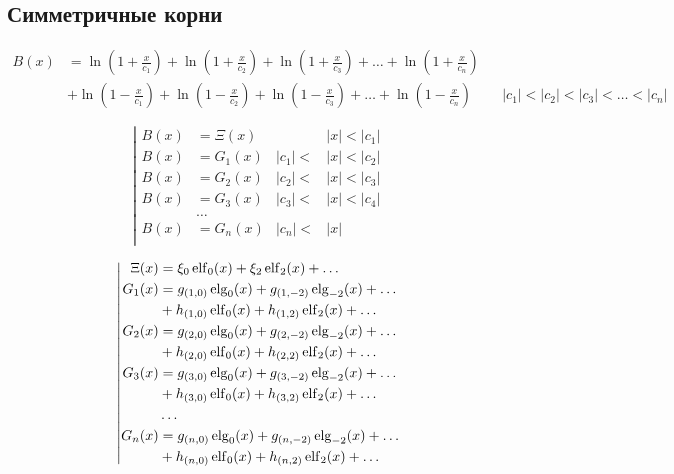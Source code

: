 
\subsection{Симметричные корни}

\begin{equation*} \begin{aligned}
B(x) &=
  \ln{\left(1 + \frac{x}{c_1} \right)}
+ \ln{\left(1 + \frac{x}{c_2} \right)}
+ \ln{\left(1 + \frac{x}{c_3} \right)}
+ \ldots
+ \ln{\left(1 + \frac{x}{c_n} \right)} \\ &
+ \ln{\left(1 - \frac{x}{c_1} \right)}
+ \ln{\left(1 - \frac{x}{c_2} \right)}
+ \ln{\left(1 - \frac{x}{c_3} \right)}
+ \ldots
+ \ln{\left(1 - \frac{x}{c_n} \right)} &
&|c_1| < |c_2| < |c_3| < \ldots < |c_n|
\end{aligned} \end{equation*}

\begin{equation*} \left| \begin{aligned}
B(x) &= \Xi(x) & 
&|x| < |c_1| \\
%
B(x) &= G_1(x) & 
|c_1| < &|x| < |c_2| \\
%
B(x) &= G_2(x) & 
|c_2| < &|x| < |c_3| \\
%
B(x) &= G_3(x) &
|c_3| < &|x| < |c_4| \\
&\ldots & & \\
%
B(x) &= G_n(x) &
|c_n| < &|x| \\
\end{aligned} \right. \end{equation*}

\begin{equation*} \left| \begin{aligned}
\Xi(x) &=
  \xi_0 \elf_0(x)
+ \xi_2 \elf_2(x) 
+ \ldots \\
%
G_1(x) &=
  g_{(1,0)} \elg_0(x) 
+ g_{(1,-2)} \elg_{-2}(x)
+ \ldots \\ &
+ h_{(1,0)} \elf_0(x)
+ h_{(1,2)} \elf_2(x)
+ \ldots \\
%
G_2(x) &=
  g_{(2,0)} \elg_0(x) 
+ g_{(2,-2)} \elg_{-2}(x)
+ \ldots \\ &
+ h_{(2,0)} \elf_0(x)
+ h_{(2,2)} \elf_2(x)
+ \ldots \\
%
G_3(x) &=
  g_{(3,0)} \elg_0(x) 
+ g_{(3,-2)} \elg_{-2}(x)
+ \ldots \\ &
+ h_{(3,0)} \elf_0(x)
+ h_{(3,2)} \elf_2(x)
+ \ldots \\
%
&\ldots \\
%
G_n(x) &=
  g_{(n,0)} \elg_0(x) 
+ g_{(n,-2)} \elg_{-2}(x)
+ \ldots \\ &
+ h_{(n,0)} \elf_0(x)
+ h_{(n,2)} \elf_2(x)
+ \ldots \\
\end{aligned} \right. \end{equation*}

